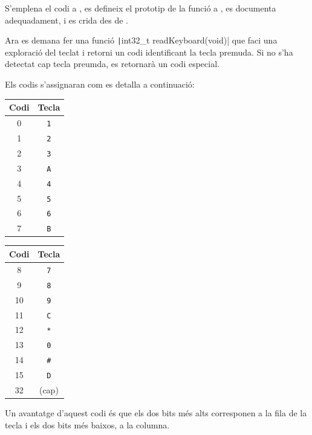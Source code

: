 S'emplena el codi a , es defineix el prototip de la funció a
, es documenta adequadament, i es crida des de .

Ara es demana fer una funció \texttt|int32_t readKeyboard(void)| que faci
una exploració del teclat i retorni un codi identificant la tecla premuda.
Si no s'ha detectat cap tecla preumda, es retornarà un codi especial.

Els codis s'assignaran com es detalla a continuació:

\begin{multicols}{2}

\begin{center} \begin{tabular}{cc}
\toprule
Codi & Tecla \\ \midrule
0 & \texttt{1} \\
1 & \texttt{2} \\
2 & \texttt{3} \\
3 & \texttt{A} \\
4 & \texttt{4} \\
5 & \texttt{5} \\
6 & \texttt{6} \\
7 & \texttt{B} \\
\bottomrule
\end{tabular} \end{center}

\begin{center} \begin{tabular}{cc}
\toprule
Codi & Tecla \\ \midrule
8 & \texttt{7} \\
9 & \texttt{8} \\
10 & \texttt{9} \\
11 & \texttt{C} \\
12 & \texttt{*} \\
13 & \texttt{0} \\
14 & \texttt{\#} \\
15 & \texttt{D} \\
32 & (cap) \\
\bottomrule
\end{tabular} \end{center}

\end{multicols}

Un avantatge d'aquest codi és que els dos bits més alts corresponen a la fila
de la tecla i els dos bits més baixos, a la columna.

